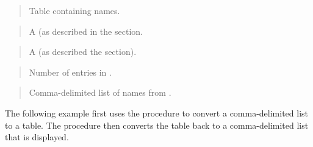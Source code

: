 \documentclass[letterpaper,10pt,english,openany,oneside]{sphinxmanual}
\begin{document}

\begin{quote}

Table containing names.
\end{quote}

\begin{quote}

A  (as described in the {\hyperref[\detokenize{dbms_utility:lname-array}]{}} section.
\end{quote}

\begin{quote}

A  (as described the {\hyperref[\detokenize{dbms_utility:uncl-array}]{}} section).
\end{quote}

\begin{quote}

Number of entries in .
\end{quote}

\begin{quote}

Comma-delimited list of names from .
\end{quote}


The following example first uses the  procedure to
convert a comma-delimited list to a table. The 
procedure then converts the table back to a comma-delimited list that is
displayed.
\end{document}
